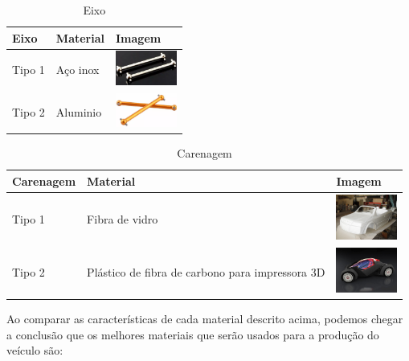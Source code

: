   \begin{table}[!htbp]
  \begin{center}
  \caption{Eixo}
  \begin{tabular}{|p{2cm}|p{3cm}|p{2cm}|}
  \hline
  \textbf{Eixo} & \textbf{Material} & \textbf{Imagem}\\\hline\hline
  Tipo 1 & Aço inox & \includegraphics[width=2cm]{figuras/eixo_inox.eps}\\\hline
  Tipo 2 & Aluminio  & \includegraphics[width=2cm]{figuras/eixo_aluminio.eps}\\\hline
  \end{tabular}
  \end{center}
  \end{table}

    \begin{table}[!htbp]
    	\begin{center}
    		\caption{Carenagem}
    		\begin{tabular}{|p{3cm}|p{3cm}|p{2cm}|}
    			\hline
    			\textbf{Carenagem} & \textbf{Material} & \textbf{Imagem} 
    			\\\hline\hline
    			Tipo 1 & Fibra de vidro & \includegraphics[width=2cm]{figuras/carenagem_fibra.eps}\\\hline
    			Tipo 2 & Plástico de fibra de carbono para impressora 3D & \includegraphics[width=2cm]{figuras/carenagem_plastico.eps}\\\hline
    		\end{tabular}
    	\end{center}
    \end{table}


    \newpage

  Ao comparar as características de cada material descrito acima, podemos chegar a conclusão que os melhores materiais que
  serão usados para a produção do veículo são:

